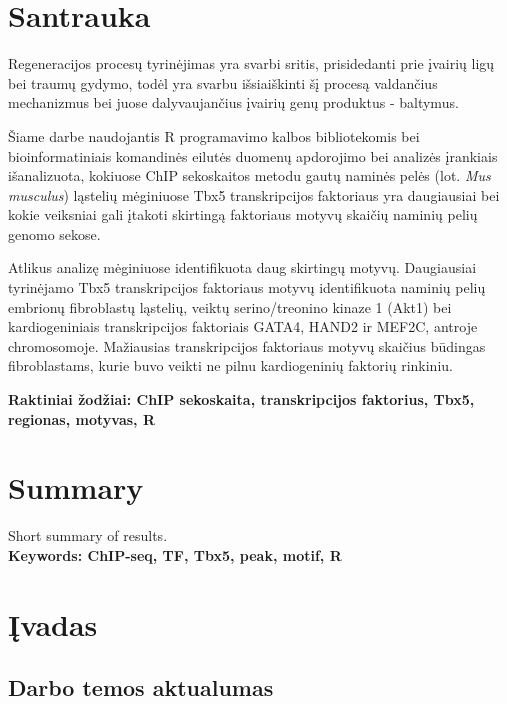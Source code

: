 \documentclass[12pt]{article}
\begin{document}
\section*{Santrauka}
Regeneracijos procesų tyrinėjimas yra svarbi sritis, prisidedanti prie įvairių
ligų bei traumų gydymo, todėl yra svarbu išsiaiškinti šį procesą valdančius
mechanizmus bei juose dalyvaujančius įvairių genų produktus - baltymus.
                                                                                     
Šiame darbe naudojantis R programavimo kalbos bibliotekomis bei
bioinformatiniais komandinės eilutės duomenų apdorojimo bei analizės įrankiais
išanalizuota, kokiuose ChIP sekoskaitos metodu gautų naminės pelės (lot.
\emph{Mus musculus}) ląstelių mėginiuose Tbx5 transkripcijos faktoriaus yra
daugiausiai bei kokie veiksniai gali įtakoti skirtingą faktoriaus motyvų
skaičių naminių pelių genomo sekose.

Atlikus analizę mėginiuose identifikuota daug skirtingų motyvų. Daugiausiai
tyrinėjamo Tbx5 transkripcijos faktoriaus motyvų identifikuota naminių pelių
embrionų fibroblastų ląstelių, veiktų serino/treonino kinaze 1 (Akt1) bei
kardiogeniniais transkripcijos faktoriais GATA4, HAND2 ir MEF2C, antroje
chromosomoje. Mažiausias transkripcijos faktoriaus motyvų skaičius būdingas
fibroblastams, kurie buvo veikti ne pilnu kardiogeninių faktorių rinkiniu.

\hfill \break
\textbf{Raktiniai žodžiai: ChIP sekoskaita, transkripcijos faktorius, Tbx5,
        regionas, motyvas, R}
\newpage

\section*{Summary}
Short summary of results.\\

\textbf{Keywords: ChIP-seq, TF, Tbx5, peak, motif, R}
\newpage

\section{Įvadas}
\subsection*{Darbo temos aktualumas}
\end{document}

